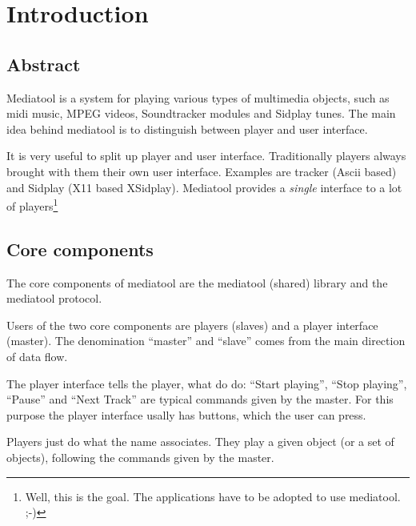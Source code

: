 


\section{Introduction}

\subsection{Abstract}

Mediatool is a system for playing various types of multimedia objects, such
as midi music, MPEG videos, Soundtracker modules and Sidplay tunes. The main
idea behind mediatool is to distinguish between player and user interface.

It is very useful to split up player and user interface. Traditionally players
always brought with them their own user interface. Examples are tracker (Ascii
based) and Sidplay (X11 based XSidplay).
Mediatool provides a {\it single} interface to a lot of players\footnote{Well,
this is the goal. The applications have to be adopted to use mediatool.  ;-)}




\subsection{Core components}

The core components of mediatool are the mediatool (shared) library and the
mediatool protocol.

Users of the two core components are players (slaves) and a player interface
(master). The denomination ``master'' and ``slave'' comes from the main
direction of data flow.

The player interface tells the player, what do do:
``Start playing'', ``Stop playing'', ``Pause'' and ``Next Track'' are typical
commands given by the master. For this purpose the player interface usally has
buttons, which the user can press.

Players just do what the name associates. They play a given object (or a set of
objects), following the commands given by the master.





